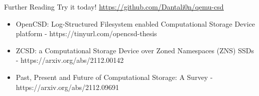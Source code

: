 \documentclass{beamer}
\begin{document}


\begin{frame}{Further Reading}
	\begingroup
	\small Try it today! \underline{\url{https://github.com/Dantali0n/qemu-csd}}
	\begin{itemize}
		\item OpenCSD: Log-Structured Filesystem enabled Computational
		Storage Device platform - https://tinyurl.com/opencsd-thesis
		\item ZCSD: a Computational Storage Device over Zoned Namespaces (ZNS)
			SSDs - https://arxiv.org/abs/2112.00142
		\item Past, Present and Future of Computational Storage: A Survey
			- https://arxiv.org/abs/2112.09691
	\end{itemize}
	\endgroup
\end{frame}
\end{document}
